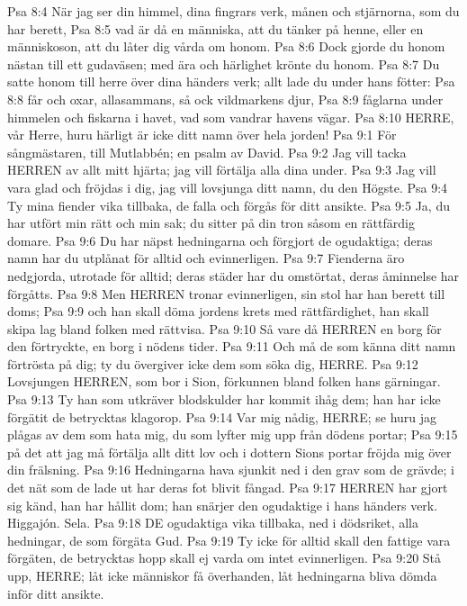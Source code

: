 Psa 8:4  När jag ser din himmel, dina fingrars verk, månen och stjärnorna, som du har berett,
Psa 8:5  vad är då en människa, att du tänker på henne, eller en människoson, att du låter dig vårda om honom.
Psa 8:6  Dock gjorde du honom nästan till ett gudaväsen; med ära och härlighet krönte du honom.
Psa 8:7  Du satte honom till herre över dina händers verk; allt lade du under hans fötter:
Psa 8:8  får och oxar, allasammans, så ock vildmarkens djur,
Psa 8:9  fåglarna under himmelen och fiskarna i havet, vad som vandrar havens vägar.
Psa 8:10  HERRE, vår Herre, huru härligt är icke ditt namn över hela jorden!
Psa 9:1  För sångmästaren, till Mutlabbén; en psalm av David.
Psa 9:2  Jag vill tacka HERREN av allt mitt hjärta; jag vill förtälja alla dina under.
Psa 9:3  Jag vill vara glad och fröjdas i dig, jag vill lovsjunga ditt namn, du den Högste.
Psa 9:4  Ty mina fiender vika tillbaka, de falla och förgås för ditt ansikte.
Psa 9:5  Ja, du har utfört min rätt och min sak; du sitter på din tron såsom en rättfärdig domare.
Psa 9:6  Du har näpst hedningarna och förgjort de ogudaktiga; deras namn har du utplånat för alltid och evinnerligen.
Psa 9:7  Fienderna äro nedgjorda, utrotade för alltid; deras städer har du omstörtat, deras åminnelse har förgåtts.
Psa 9:8  Men HERREN tronar evinnerligen, sin stol har han berett till doms;
Psa 9:9  och han skall döma jordens krets med rättfärdighet, han skall skipa lag bland folken med rättvisa.
Psa 9:10  Så vare då HERREN en borg för den förtryckte, en borg i nödens tider.
Psa 9:11  Och må de som känna ditt namn förtrösta på dig; ty du övergiver icke dem som söka dig, HERRE.
Psa 9:12  Lovsjungen HERREN, som bor i Sion, förkunnen bland folken hans gärningar.
Psa 9:13  Ty han som utkräver blodskulder har kommit ihåg dem; han har icke förgätit de betrycktas klagorop.
Psa 9:14  Var mig nådig, HERRE; se huru jag plågas av dem som hata mig, du som lyfter mig upp från dödens portar;
Psa 9:15  på det att jag må förtälja allt ditt lov och i dottern Sions portar fröjda mig över din frälsning.
Psa 9:16  Hedningarna hava sjunkit ned i den grav som de grävde; i det nät som de lade ut har deras fot blivit fångad.
Psa 9:17  HERREN har gjort sig känd, han har hållit dom; han snärjer den ogudaktige i hans händers verk. Higgajón. Sela.
Psa 9:18  DE ogudaktiga vika tillbaka, ned i dödsriket, alla hedningar, de som förgäta Gud.
Psa 9:19  Ty icke för alltid skall den fattige vara förgäten, de betrycktas hopp skall ej varda om intet evinnerligen.
Psa 9:20  Stå upp, HERRE; låt icke människor få överhanden, låt hedningarna bliva dömda inför ditt ansikte.
